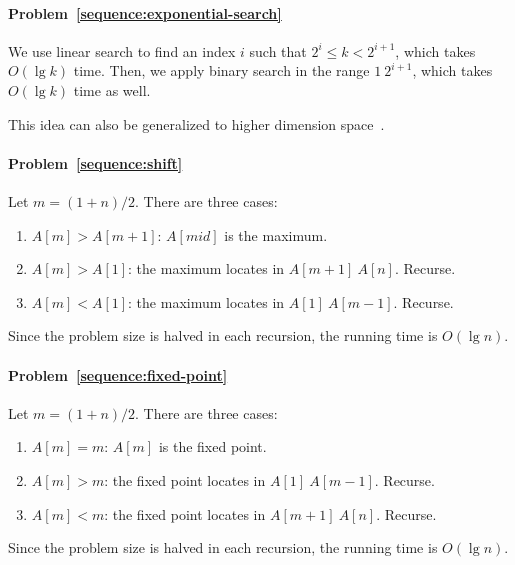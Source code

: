 \begin{Answer}
\paragraph{Problem~\ref{sequence:exponential-search}}
We use linear search to find an index $i$ such that $2^i \leq k < 2^{i+1}$, which takes $O(\lg k)$ time.
Then, we apply binary search in the range $1 ~ 2^{i + 1}$, which takes $O(\lg k)$ time as well.

This idea can also be generalized to higher dimension space~\cite{Bentley1976}.

\paragraph{Problem~\ref{sequence:shift}}
Let $m = (1 + n)/2$. There are three cases:
\begin{enumerate}
\item $A[m] > A[m+1]$: $A[mid]$ is the maximum.
\item $A[m] > A[1]$: the maximum locates in $A[m + 1] ~ A[n]$. Recurse.
\item $A[m] < A[1]$: the maximum locates in $A[1] ~ A[m-1]$. Recurse.
\end{enumerate}
Since the problem size is halved in each recursion, the running time is $O(\lg n)$.

\paragraph{Problem~\ref{sequence:fixed-point}}
Let $m = (1 + n)/2$. There are three cases:
\begin{enumerate}
\item $A[m] = m$: $A[m]$ is the fixed point.
\item $A[m] > m$: the fixed point locates in $A[1] ~ A[m - 1]$. Recurse.
\item $A[m] < m$: the fixed point locates in $A[m + 1] ~ A[n]$. Recurse.
\end{enumerate}
Since the problem size is halved in each recursion, the running time is $O(\lg n)$.

\end{Answer}

